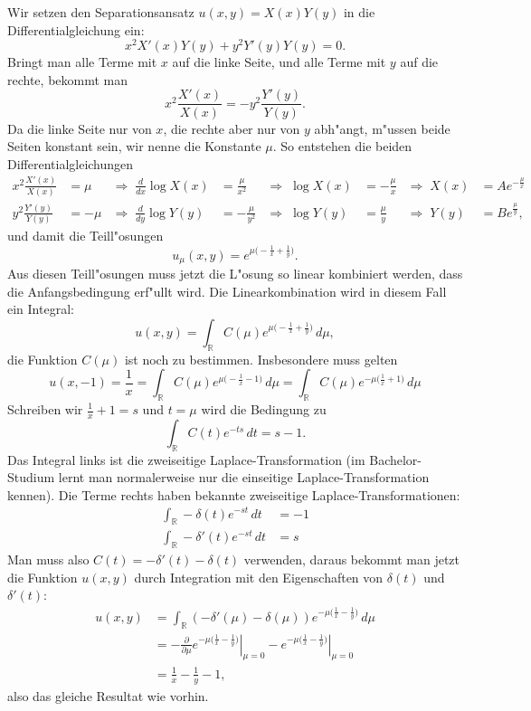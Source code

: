 \begin{loesung}
Wir setzen den Separationsansatz $u(x,y)=X(x)Y(y)$ in die
Differentialgleichung ein:
\[
x^2X'(x)Y(y)+y^2Y'(y)Y(y)=0.
\]
Bringt man alle Terme mit $x$ auf die linke Seite, und alle Terme
mit $y$ auf die rechte, bekommt man
\[
x^2\frac{X'(x)}{X(x)}=- y^2\frac{Y'(y)}{Y(y)}.
\]
Da die linke Seite nur von $x$, die rechte aber nur von $y$ abh"angt,
m"ussen beide Seiten konstant sein, wir nenne die Konstante $\mu$.
So entstehen die beiden Differentialgleichungen
\begin{align*}
x^2\frac{X'(x)}{X(x)}&=\mu
&
\Rightarrow\;
\frac{d}{dx}\log X(x)&=\frac{\mu}{x^2}
&
\Rightarrow\;
\log X(x)&=-\frac{\mu}{x}
&
\Rightarrow\;
X(x)&=Ae^{-\frac{\mu}{x}}
\\
y^2\frac{Y'(y)}{Y(y)}&=-\mu
&
\Rightarrow\;
\frac{d}{dy}\log Y(y)&=-\frac{\mu}{y^2}
&
\Rightarrow\;
\log Y(y)&=\frac{\mu}{y}
&
\Rightarrow\;
Y(y)&=Be^{\frac{\mu}{y}},
\end{align*}
und damit die Teill"osungen
\[
u_\mu(x,y)=e^{\mu\bigl(-\frac1x+\frac1y\bigr)}.
\]
Aus diesen Teill"osungen muss jetzt die L"osung so linear kombiniert
werden, dass die Anfangsbedingung erf"ullt wird. Die Linearkombination
wird in diesem Fall ein Integral:
\[
u(x,y)=\int_{\mathbb R}C(\mu)
e^{\mu\bigl(-\frac1x+\frac1y\bigr)}\,d\mu,
\]
die Funktion $C(\mu)$ ist noch zu bestimmen.
Insbesondere muss gelten
\[
u(x,-1)
=
\frac1x
=
\int_{\mathbb R}C(\mu)e^{\mu\bigl(-\frac1x-1)}\,d\mu
=
\int_{\mathbb R}C(\mu)e^{-\mu\bigl(\frac1x+1)}\,d\mu
\]
Schreiben wir $\frac1x+1=s$ und $t=\mu$ wird die Bedingung
zu
\[
\int_{\mathbb R}C(t)e^{-ts}\,dt=s-1.
\]
Das Integral links ist die zweiseitige Laplace-Transformation
(im Bachelor-Studium lernt man normalerweise nur die einseitige
Laplace-Transformation kennen). Die Terme rechts haben bekannte
zweiseitige Laplace-Transformationen:
\begin{align*}
\int_{\mathbb R}-\delta(t)e^{-st}\,dt&=-1\\
\int_{\mathbb R}-\delta'(t)e^{-st}\,dt&=s
\end{align*}
Man muss also $C(t)=-\delta'(t)-\delta(t)$ verwenden, daraus bekommt
man jetzt die Funktion $u(x,y)$ durch Integration mit den Eigenschaften
von $\delta(t)$ und $\delta'(t)$:
\begin{align*}
u(x,y)
&=
\int_{\mathbb R}
(-\delta'(\mu)-\delta(\mu))
e^{-\mu\bigl(\frac1x-\frac1y\bigr)}\,d\mu
\\
&=
-\left.\frac{\partial}{\partial \mu}
e^{-\mu\bigl(\frac1x-\frac1y\bigr)}\right|_{\mu=0}
-
\left.e^{-\mu\bigl(\frac1x-\frac1y\bigr)}\right|_{\mu=0}
\\
&=
\frac1x-\frac1y-1,
\end{align*}
also das gleiche Resultat wie vorhin.
\end{loesung}
